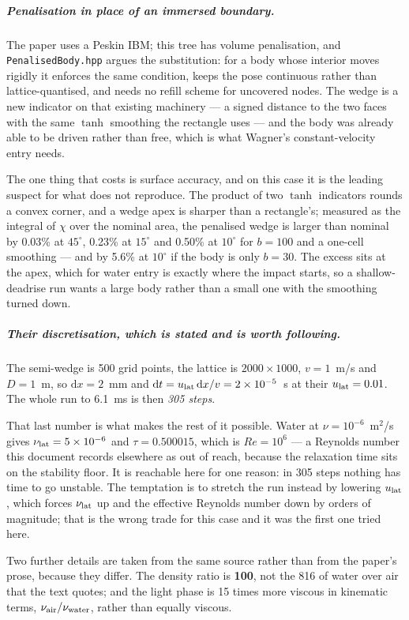 \documentclass[11pt,a4paper]{article}
\newcommand{\code}[1]{\texttt{\small #1}}
\newcommand{\e}[1]{\times 10^{#1}}
\begin{document}
\subparagraph{Penalisation in place of an immersed boundary.} The paper uses a
Peskin IBM; this tree has volume penalisation, and \code{PenalisedBody.hpp}
argues the substitution: for a body whose interior moves rigidly it enforces
the same condition, keeps the pose continuous rather than lattice-quantised,
and needs no refill scheme for uncovered nodes. The wedge is a new indicator on
that existing machinery --- a signed distance to the two faces with the same
$\tanh$ smoothing the rectangle uses --- and the body was already able to be
driven rather than free, which is what Wagner's constant-velocity entry needs.

The one thing that costs is surface accuracy, and on this case it is the
leading suspect for what does not reproduce. The product of two $\tanh$ indicators rounds a convex corner, and
a wedge apex is sharper than a rectangle's; measured as the integral of $\chi$
over the nominal area, the penalised wedge is larger than nominal by 0.03\% at
$45^\circ$, 0.23\% at $15^\circ$ and 0.50\% at $10^\circ$ for $b=100$ and a
one-cell smoothing --- and by 5.6\% at $10^\circ$ if the body is only $b=30$.
The excess sits at the apex, which for water entry is exactly where the impact
starts, so a shallow-deadrise run wants a large body rather than a small one
with the smoothing turned down.

\subparagraph{Their discretisation, which is stated and is worth following.}
The semi-wedge is 500 grid points, the lattice is $2000\times1000$, $v=1$~m/s
and $D=1$~m, so $\mathrm{d}x = 2$~mm and $\mathrm{d}t = u_{\rm lat}\,
\mathrm{d}x/v = 2\e{-5}$~s at their $u_{\rm lat}=0.01$. The whole run to
6.1~ms is then \emph{305 steps}.

That last number is what makes the rest of it possible. Water at
$\nu=10^{-6}$~m$^2$/s gives $\nu_{\rm lat}=5\e{-6}$ and $\tau=0.500015$, which
is $Re=10^6$ --- a Reynolds number this document records elsewhere as out of
reach, because the relaxation time sits on the stability floor. It is reachable
here for one reason: in 305 steps nothing has time to go unstable. The
temptation is to stretch the run instead by lowering $u_{\rm lat}$, which
forces $\nu_{\rm lat}$ up and the effective Reynolds number down by orders of
magnitude; that is the wrong trade for this case and it was the first one tried
here.

Two further details are taken from the same source rather than from the paper's
prose, because they differ. The density ratio is \textbf{100}, not the 816 of
water over air that the text quotes; and the light phase is 15 times more
viscous in kinematic terms, $\nu_{\rm air}/\nu_{\rm water}$, rather than
equally viscous.
\end{document}
